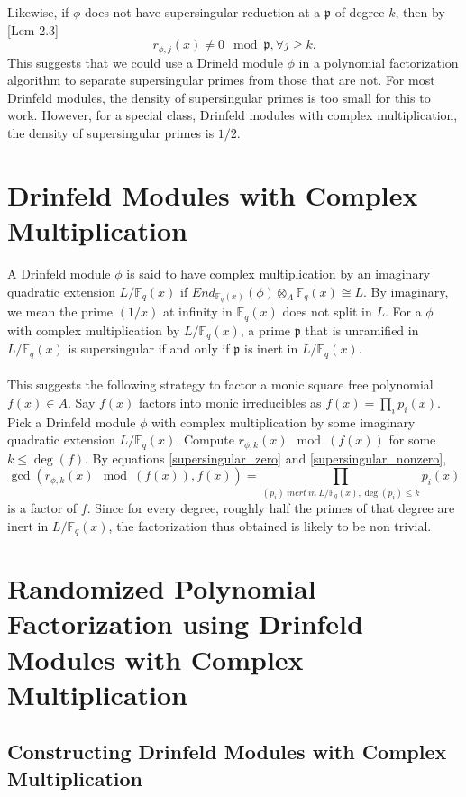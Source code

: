 \documentclass[12pt]{article}
\theoremstyle{plain}
\theoremstyle{definition}
\def\F{\ensuremath{\mathbb{F}}}
\newcommand{\p}{\mathfrak p}
\begin{document}
Likewise, if $\phi$ does not have supersingular reduction at a $\p$ of degree $k$, then by \cite{cor}[Lem 2.3]
\begin{equation}\label{supersingular_nonzero}
 r_{\phi,j}(x) \neq 0 \mod \p , \forall j \geq k.
\end{equation}
This suggests that we could use a Drineld module $\phi$ in a polynomial factorization algorithm to 
separate supersingular primes from those that are not. For most Drinfeld modules, the density of 
supersingular primes is too small for this to work. However, for a special class, Drinfeld modules 
with complex multiplication, the density of supersingular primes is $1/2$. 


\section{Drinfeld Modules with Complex Multiplication}\label{randomized_section}
A Drinfeld module $\phi$ is said to have complex multiplication by an imaginary quadratic extension $L/\F_q(x)$ if $End_{\F_q(x)}(\phi)\otimes_A \F_q(x) \cong L$. By imaginary, we mean the prime $(1/x)$ at infinity in $\F_q(x)$ does not split in $L$. For a $\phi$ with complex multiplication by $L/\F_q(x)$, a prime $\p$ that is unramified in $L/\F_q(x)$  is supersingular if and only if $\p$ is inert in $L/\F_q(x)$.\\ \\
This suggests the following  strategy to factor a monic square free polynomial $f(x) \in A$. Say 
$f(x)$ factors into monic irreducibles as $f(x) = \prod_i p_i(x)$. Pick a Drinfeld module $\phi$ 
with complex multiplication by some imaginary quadratic extension $L/\F_q(x)$. Compute 
$r_{\phi,k}(x) \mod (f(x))$ for some $k \leq \deg(f)$. By equations \ref{supersingular_zero} and 
\ref{supersingular_nonzero}, $$\gcd(r_{\phi,k}(x) \mod (f(x)), f(x)) = \prod_{(p_i)\ inert\ in\ 
L/\F_q(x), \deg(p_i)\leq k}p_i(x)$$ is a factor of $f$. Since for every degree, roughly half the 
primes of that degree are inert in $L/\F_q(x)$, the factorization  thus obtained is likely to be 
non trivial. 


\section{Randomized Polynomial Factorization using Drinfeld Modules with Complex Multiplication}
\subsection{Constructing Drinfeld Modules with Complex 
Multiplication}\label{drinfeld_construction_subsection}
\end{document}
